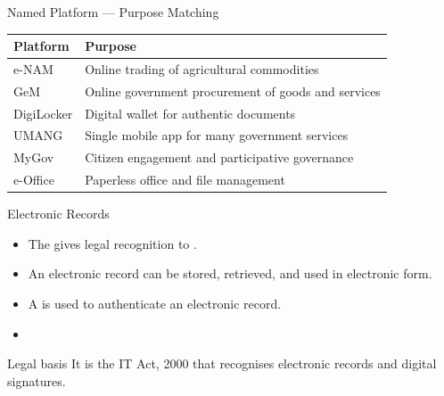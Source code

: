 \documentclass[aspectratio=169]{beamer}
\begin{document}
\begin{frame}{Named Platform --- Purpose Matching}
  \begin{center}
    \begin{tabular}{p{}p{}}
      \toprule
      \textbf{Platform} & \textbf{Purpose} \\
      \midrule
      e-NAM & Online trading of agricultural commodities \\
      GeM & Online government procurement of goods and services \\
      DigiLocker & Digital wallet for authentic documents \\
      UMANG & Single mobile app for many government services \\
      MyGov & Citizen engagement and participative governance \\
      e-Office & Paperless office and file management \\
      \bottomrule
    \end{tabular}
  \end{center}
  \vspace{0.2cm}
\end{frame}

\begin{frame}{Electronic Records}
  \begin{itemize}
    \item The  gives legal recognition
      to .
    \item An electronic record can be stored, retrieved, and used in
      electronic form.
    \item A  is used to authenticate an electronic
      record.
    \item {}
  \end{itemize}
  \begin{block}{Legal basis}
    It is the IT Act, 2000 that recognises electronic records and digital
    signatures.
  \end{block}
\end{frame}
\end{document}
